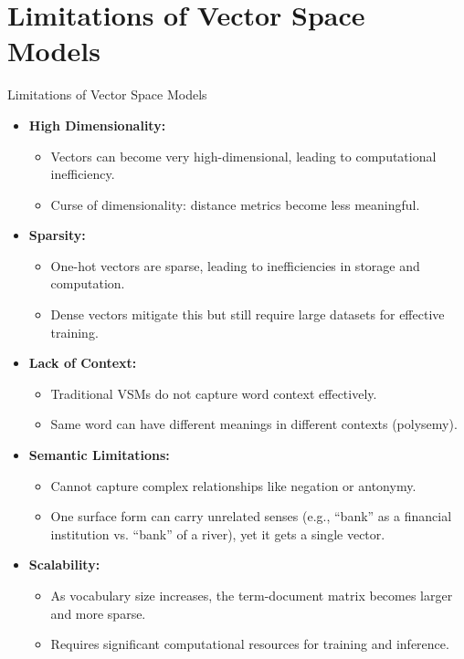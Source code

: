 \section{Limitations of Vector Space Models}
\begin{frame}[allowframebreaks]{Limitations of Vector Space Models}
    \begin{itemize}
        \item \textbf{High Dimensionality:}
        \begin{itemize}
            \item Vectors can become very high-dimensional, leading to computational inefficiency.
            \item Curse of dimensionality: distance metrics become less meaningful.
        \end{itemize}
        \item \textbf{Sparsity:}
        \begin{itemize}
            \item One-hot vectors are sparse, leading to inefficiencies in storage and computation.
            \item Dense vectors mitigate this but still require large datasets for effective training.
        \end{itemize}
        \item \textbf{Lack of Context:}
        \begin{itemize}
            \item Traditional VSMs do not capture word context effectively.
            \item Same word can have different meanings in different contexts (polysemy).
        \end{itemize}
\framebreak
        \item \textbf{Semantic Limitations:}
        \begin{itemize}
            \item Cannot capture complex relationships like negation or antonymy.
            \item One surface form can carry unrelated senses (e.g., ``bank'' as a financial institution vs. ``bank'' of a river), yet it gets a single vector.
        \end{itemize}
        \item \textbf{Scalability:}
        \begin{itemize}
            \item As vocabulary size increases, the term-document matrix becomes larger and more sparse.
            \item Requires significant computational resources for training and inference.
        \end{itemize}
    \end{itemize}
\end{frame}